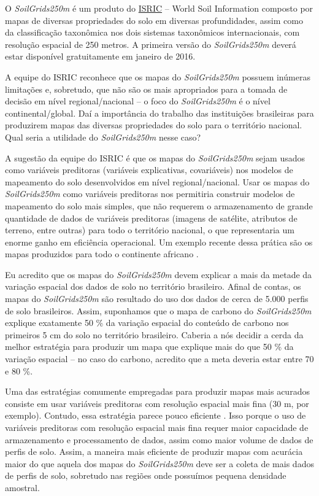 O \textit{SoilGrids250m} é um produto do \href{http://www.isric.org/}{ISRIC} -- 
World Soil Information composto por mapas de diversas propriedades do solo em 
diversas profundidades, assim como da classificação taxonômica nos dois sistemas
taxonômicos internacionais, com resolução espacial de 250 metros. A primeira 
versão do \textit{SoilGrids250m} deverá estar disponível gratuitamente em 
janeiro de 2016.

A equipe do ISRIC reconhece que os mapas do \textit{SoilGrids250m} possuem 
inúmeras limitações e, sobretudo, que não são os mais apropriados para a tomada 
de decisão em nível regional/nacional -- o foco do \textit{SoilGrids250m} é o 
nível continental/global. Daí a importância do trabalho das instituições 
brasileiras para produzirem mapas das diversas propriedades do solo para o 
território nacional. Qual seria a utilidade do \textit{SoilGrids250m} nesse 
caso?

A sugestão da equipe do ISRIC é que os mapas do \textit{SoilGrids250m} sejam 
usados como variáveis preditoras (variáveis explicativas, covariáveis) nos 
modelos de mapeamento do solo desenvolvidos em nível regional/nacional. Usar os 
mapas do \textit{SoilGrids250m} como variáveis preditoras nos permitiria 
construir modelos de mapeamento do solo mais simples, que não requerem o 
armazenamento de grande quantidade de dados de variáveis preditoras (imagens de 
satélite, atributos de terreno, entre outras) para todo o território nacional, 
o que representaria um enorme ganho em eficiência operacional. Um exemplo 
recente dessa prática são os mapas produzidos para todo o continente africano 
\cite{HenglEtAl2015}.

Eu acredito que os mapas do \textit{SoilGrids250m} devem explicar a mais da 
metade da variação espacial dos dados de solo no território brasileiro. Afinal 
de contas, os mapas do \textit{SoilGrids250m} são resultado do uso dos dados de 
cerca de 5.000 perfis de solo brasileiros. Assim, suponhamos que o mapa de 
carbono do \textit{SoilGrids250m} explique exatamente 50 \% da variação espacial
do conteúdo de carbono nos primeiros 5 cm do solo no território brasileiro. 
Caberia a nós decidir a cerda da melhor estratégia para produzir um mapa que 
explique mais do que 50 \% da variação espacial -- no caso do carbono, acredito
que a meta deveria estar entre 70 e 80 \%.

Uma das estratégias comumente empregadas para produzir mapas mais acurados 
consiste em usar variáveis preditoras com resolução espacial mais fina (30 m, 
por exemplo). Contudo, essa estratégia parece pouco eficiente 
\cite{Samuel-RosaEtAl2015}. Isso porque o uso de variáveis preditoras com 
resolução espacial mais fina requer maior capacidade de armazenamento e 
processamento de dados, assim como maior volume de dados de perfis de solo. 
Assim, a maneira mais eficiente de produzir mapas com acurácia maior do que 
aquela dos mapas do \textit{SoilGrids250m} deve ser a coleta de mais dados de 
perfis de solo, sobretudo nas regiões onde possuímos pequena densidade amostral.

